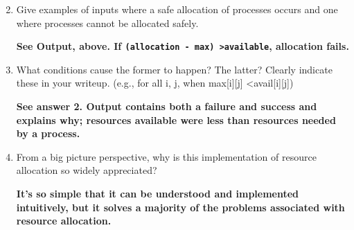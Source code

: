 \documentclass[11pt]{article}
\begin{document}
\begin{enumerate}
\setcounter{enumi}{1}

\item Give examples of inputs where a safe allocation of processes occurs and one where processes cannot be allocated safely.

\textbf{See Output, above. If \texttt{(allocation - max) \textgreater available}, allocation fails.}

\item What conditions cause the former to happen? The latter? Clearly indicate these in your writeup. (e.g., for all i, j, when max[i][j] \textless avail[i][j])

\textbf{See answer 2. Output contains both a failure and success and explains why; resources available were less than resources needed by a process.}

\item From a big picture perspective, why is this implementation of resource allocation so widely appreciated?

\textbf{It's so simple that it can be understood and implemented intuitively, but it solves a majority of the problems associated with resource allocation.}

\end{enumerate}
\end{document}

